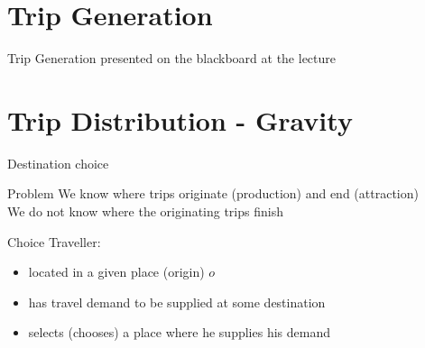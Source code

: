 \documentclass[8pt]{beamer}
\begin{document}
\section{Trip Generation}
\begin{frame}{Trip Generation}
presented on the blackboard at the lecture
\end{frame}

\section{Trip Distribution - Gravity}
\begin{frame}{Destination choice}
\begin{block}{Problem}
We know where trips originate (production) and end (attraction) \\
We \alert{do not know} where the originating trips finish
\end{block}
\begin{block}{Choice}
Traveller:
\begin{itemize}
 \item located in a given place (origin) $o$
 \item has travel demand to be supplied at some destination  
 \item selects (chooses) a place where he supplies his demand
 \end{itemize} 
 \end{block}
\end{frame}
\end{document}
